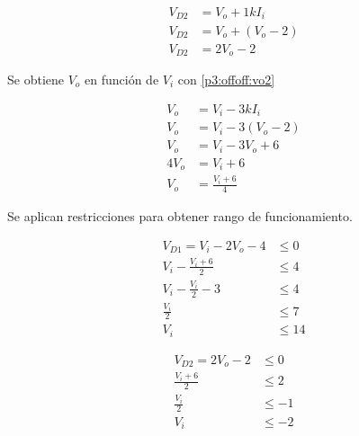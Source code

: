 \begin{align*}
  V_{D2} &= V_o + 1k I_i
  \\
  V_{D2} &= V_o + \left(V_o - 2\right)
  \\
  V_{D2} &= 2 V_o - 2
\end{align*}

Se obtiene $V_o$ en función de $V_i$ con \ref{p3:offoff:vo2}

\begin{align*}
  V_o &= V_i - 3k I_i
  \\
  V_o &= V_i - 3 \left(V_o - 2\right)
  \\
  V_o &= V_i - 3  V_o + 6
  \\
  4 V_o &= V_i + 6
  \\
  V_o &= \frac{V_i + 6}{4}
\end{align*}

Se aplican restricciones para obtener rango de funcionamiento.

\begin{align*}
  V_{D1} = V_i - 2 V_o - 4 &\leq 0
  \\
  V_i - \frac{V_i + 6}{2} &\leq 4
  \\
  V_i - \frac{V_i}{2} -3 &\leq 4
  \\
  \frac{V_i}{2} &\leq 7
  \\
  V_i &\leq 14
\end{align*}

\begin{align*}
  V_{D2} = 2 V_o - 2 &\leq 0
  \\
  \frac{V_i + 6}{2} &\leq 2
  \\
  \frac{V_i}{2} &\leq -1
  \\
  V_i &\leq -2
\end{align*}
